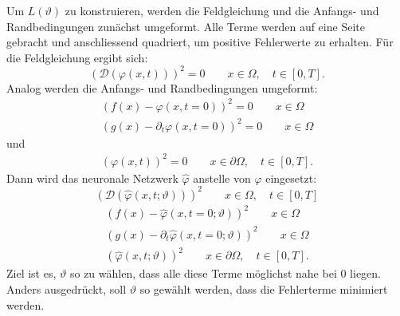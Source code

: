 Um \( L(\vartheta) \) zu konstruieren, werden die Feldgleichung und die Anfangs- und Randbedingungen zunächst umgeformt.
Alle Terme werden auf eine Seite gebracht und anschliessend quadriert, um positive Fehlerwerte zu erhalten.
Für die Feldgleichung ergibt sich:
\begin{equation}
    \left(\mathcal{D}(\varphi(x, t))\right)^2 = 0 \qquad x \in \Omega, \quad t \in [0,T].
    \label{neuronal:feldgleichung_umformuliert}
\end{equation}
Analog werden die Anfangs- und Randbedingungen umgeformt:
\begin{equation}
    \begin{aligned}
        \left(f(x) - \varphi(x, t = 0)\right)^2 = 0 \qquad x \in \Omega\\
        \left(g(x) - \partial_t \varphi(x, t = 0)\right)^2 = 0 \qquad x \in \Omega
    \end{aligned}
    \label{neuronal:anfangsbedingung_umformuliert}
\end{equation}
und
\begin{equation}
    \begin{aligned}
        \left(\varphi(x, t)\right)^2 = 0 \qquad x \in \partial \Omega, \quad t \in [0,T].
    \end{aligned}
    \label{neuronal:randbedingung_umformuliert}
\end{equation}
Dann wird das neuronale Netzwerk $\hat{\varphi}$ anstelle von $\varphi$ eingesetzt:
\begin{equation}
    \left(\mathcal{D}(\hat{\varphi}(x, t; \vartheta))\right)^2 \qquad x \in \Omega, \quad t \in [0,T]
    \label{neuronal:feldgleichung_umformuliert_netz}
\end{equation}
\begin{equation}
    \begin{aligned}
        \left(f(x) - \hat{\varphi}(x, t = 0; \vartheta)\right)^2 \qquad x \in \Omega\\
        \left(g(x) - \partial_t \hat{\varphi}(x, t = 0; \vartheta)\right)^2 \qquad x \in \Omega
    \end{aligned}
    \label{neuronal:anfangsbedingung_umformuliert_netz}
\end{equation}
\begin{equation}
    \begin{aligned}
        \left(\hat{\varphi}(x, t; \vartheta)\right)^2 \qquad x \in \partial \Omega, \quad t \in [0,T].
    \end{aligned}
    \label{neuronal:randbedingung_umformuliert_netz}
\end{equation}
Ziel ist es, $\vartheta$ so zu wählen, dass alle diese Terme möglichst nahe bei 0 liegen.
Anders ausgedrückt, soll $\vartheta$ so gewählt werden, dass die Fehlerterme minimiert werden.

